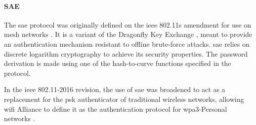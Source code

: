 \paragraph{SAE}

The \gls{sae} protocol was originally defined on the \gls{ieee} 802.11s amendment for use on mesh networks \cite{ieee_80211_2020}. It is a variant of the Dragonfly Key Exchange \cite{rfc7664}, meant to provide an authentication mechanism resistant to offline brute-force attacks. \gls{sae} relies on discrete logarithm cryptography to achieve its security properties. The password derivation is made using one of the hash-to-curve functions specified in the protocol.

In the \gls{ieee} 802.11-2016 revision, the use of \gls{sae} was broadened to act as a replacement for the \gls{psk} authenticator of traditional wireless networks, allowing \gls{wifi} Alliance to define it as the authentication protocol for \gls{wpa}3-Personal networks \cite{wpa3_spec}.
